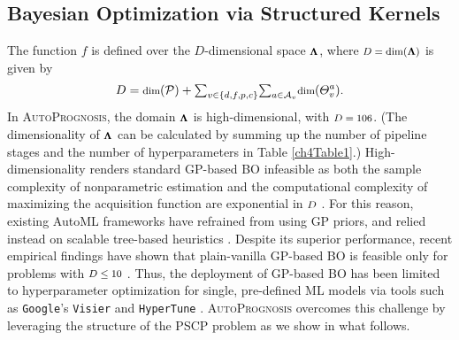 \documentclass [PhD] {uclathes}
\begin{document}
\subsection{Bayesian Optimization via Structured Kernels}  
The function $f$ is defined over the \mbox{\footnotesize $D$}-dimensional space $\mbox{\footnotesize ${\bf \Lambda}$}$, where $\mbox{\footnotesize $D = \mbox{dim}({\bf \Lambda})$}$ is given by 
\begin{align}
D = \mbox{\footnotesize dim}(\mathcal{P}) + {\textstyle \sum}_{v \in \{d,f,p,c\}} {\textstyle \sum}_{a \in \mathcal{A}_v} \mbox{\footnotesize dim}(\Theta^a_v).
\label{ch4eq3}
\end{align} 
In {\footnotesize \textsc{AutoPrognosis}}, the domain $\mbox{\footnotesize ${\bf \Lambda}$}$ is high-dimensional, with $\mbox{\footnotesize $D = 106$}$. (The dimensionality of $\mbox{\footnotesize ${\bf \Lambda}$}$ can be calculated by summing up the number of pipeline stages and the number of hyperparameters in Table \ref{ch4Table1}.) High-dimensionality renders standard GP-based BO infeasible as both the sample complexity of nonparametric estimation and the computational complexity of maximizing the acquisition function are exponential in $\mbox{\footnotesize $D$}$ \cite{gyorfi2006distribution,kandasamy2015high}. For this reason, existing AutoML frameworks have refrained from using GP priors, and relied instead on scalable tree-based heuristics \cite{feurer2015efficient,kotthoff2016auto}. Despite its superior performance, recent empirical findings have shown that plain-vanilla GP-based BO is feasible only for problems with $\mbox{\footnotesize $D \leq 10$}$ \cite{wang2013bayesian}. Thus, the deployment of GP-based BO has been limited to hyperparameter optimization for single, pre-defined ML models via tools such as \texttt{Google}'s \texttt{Visier} and \texttt{HyperTune} \cite{golovin2017google}. {\footnotesize \textsc{AutoPrognosis}} overcomes this challenge by leveraging the structure of the PSCP problem as we show in what follows. 
\end{document}
